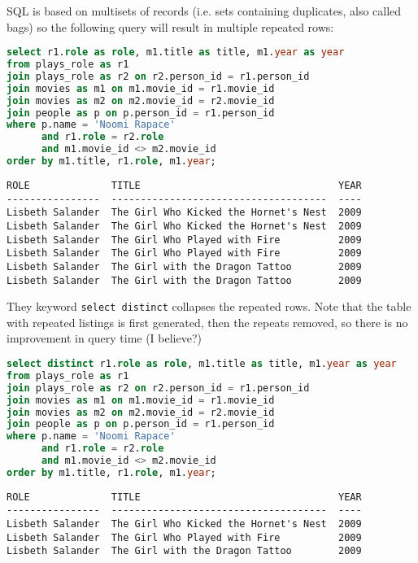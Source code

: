 \documentclass[12pt,a4paper]{article} %
\begin{document}
SQL is based on multisets of records (i.e. sets containing duplicates, also called bags) so the following query will result in multiple repeated rows:
\begin{lstlisting}[language=sql]
select r1.role as role, m1.title as title, m1.year as year
from plays_role as r1
join plays_role as r2 on r2.person_id = r1.person_id
join movies as m1 on m1.movie_id = r1.movie_id
join movies as m2 on m2.movie_id = r2.movie_id
join people as p on p.person_id = r1.person_id
where p.name = 'Noomi Rapace'
      and r1.role = r2.role
      and m1.movie_id <> m2.movie_id
order by m1.title, r1.role, m1.year;
\end{lstlisting}
\begin{lstlisting}
ROLE              TITLE                                  YEAR
----------------  -------------------------------------  ----
Lisbeth Salander  The Girl Who Kicked the Hornet's Nest  2009
Lisbeth Salander  The Girl Who Kicked the Hornet's Nest  2009
Lisbeth Salander  The Girl Who Played with Fire          2009
Lisbeth Salander  The Girl Who Played with Fire          2009
Lisbeth Salander  The Girl with the Dragon Tattoo        2009
Lisbeth Salander  The Girl with the Dragon Tattoo        2009
\end{lstlisting}
They keyword \verb|select distinct| collapses the repeated rows. Note that the table with repeated listings is first generated, then the repeats removed, so there is no improvement in query time (I believe?)
\begin{lstlisting}[language=sql]
select distinct r1.role as role, m1.title as title, m1.year as year
from plays_role as r1
join plays_role as r2 on r2.person_id = r1.person_id
join movies as m1 on m1.movie_id = r1.movie_id
join movies as m2 on m2.movie_id = r2.movie_id
join people as p on p.person_id = r1.person_id
where p.name = 'Noomi Rapace'
      and r1.role = r2.role
      and m1.movie_id <> m2.movie_id
order by m1.title, r1.role, m1.year;
\end{lstlisting}
\begin{lstlisting}
ROLE              TITLE                                  YEAR
----------------  -------------------------------------  ----
Lisbeth Salander  The Girl Who Kicked the Hornet's Nest  2009
Lisbeth Salander  The Girl Who Played with Fire          2009
Lisbeth Salander  The Girl with the Dragon Tattoo        2009
\end{lstlisting}
\end{document}
